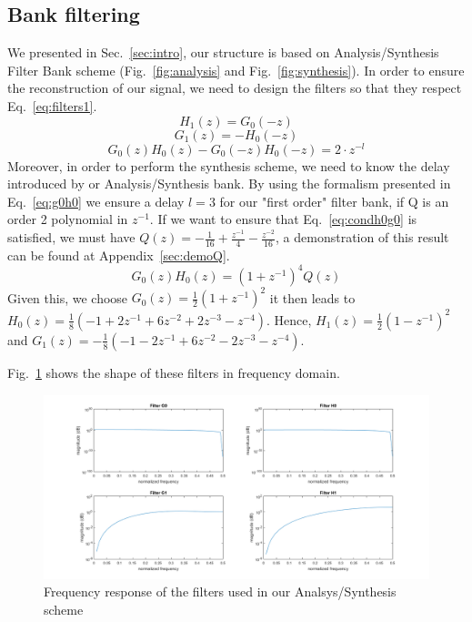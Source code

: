 \documentclass[a4paper,twocolumn]{article}
\begin{document}
\subsection{Bank filtering}
\label{sec:reconstruction}
We presented in Sec.~\ref{sec:intro}, our structure is based on Analysis/Synthesis Filter Bank scheme (Fig.~\ref{fig:analysis} and Fig.~\ref{fig:synthesis}).
In order to ensure the reconstruction of our signal, we need to design the filters so that they respect Eq.~\ref{eq:filters1}.\begin{equation}
  \label{eq:filters1}
H_1(z)=G_0(-z)
\end{equation}
\begin{equation}
G_1(z)=-H_0(-z)		
\end{equation}
\begin{equation}
\label{eq:condh0g0}
G_0(z)H_0(z)-G_0(-z)H_0(-z)=2\cdot z^{-l}		
\end{equation}
 Moreover, in order to perform the synthesis scheme, we need to know the delay introduced by or Analysis/Synthesis bank. By using the formalism presented in Eq.~\ref{eq:g0h0} we ensure a delay $l=3$ for our "first order" filter bank, if Q is an order 2 polynomial in $z^{-1}$. If we want to ensure that Eq.~\ref{eq:condh0g0} is satisfied, we must have $Q(z)=-\frac{1}{16}+\frac{z^{-1}}{4}-\frac{z^{-2}}{16}$, a demonstration of this result can be found at Appendix~\ref{sec:demoQ}.
\begin{equation}
  \label{eq:g0h0}
G_0(z)H_0(z)=(1+z^{-1})^4Q(z)
\end{equation}
Given this, we choose $G_0(z)=\frac{1}{2}\left(1+z^{-1}\right)^2$ it then leads to $H_0(z)=\frac{1}{8}\left(-1+2z^{-1}+6z^{-2}+2z^{-3}-z^{-4}\right)$. Hence, $H_1(z)=\frac{1}{2}\left(1-z^{-1}\right)^2$ and $G_1(z)=-\frac{1}{8}\left(-1-2z^{-1}+6z^{-2}-2z^{-3}-z^{-4} \right)$.

Fig.~\ref{fig:filters} shows the shape of these filters in frequency domain.


\begin{figure}[!ht]
  \begin{center}
    \includegraphics[width=1.1\columnwidth]{filters.png}
  \end{center}
  \caption{Frequency response of the filters used in our Analsys/Synthesis scheme}
  \label{fig:filters}
\end{figure}
\end{document}
